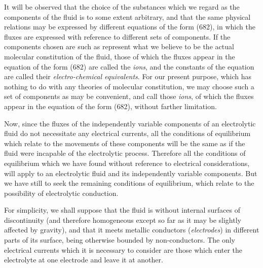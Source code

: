 \documentclass[12pt]{memoir}
\begin{document}
It will be observed that the choice of the substances which we regard as the components of the fluid is to some extent arbitrary, and that the same physical relations may be expressed by different equations of the form (682), in which the fluxes are expressed with reference to different sets of components. If the components chosen are such as represent what we believe to be the actual molecular constitution of the fluid, those of which the fluxes appear in the equation of the form (682) are called the \textit{ions}, and the constants of the equation are called their \textit{electro-chemical equivalents}. For our present purpose, which has nothing to do with any theories of molecular constitution, we may choose such a set of components as may be convenient, and call those \textit{ions}, of which the fluxes appear in the equation of the form (682), without farther limitation.

Now, since the fluxes of the independently variable components of an electrolytic fluid do not necessitate any electrical currents, all the conditions of equilibrium which relate to the movements of these components will be the same as if the fluid were incapable of the electrolytic process. Therefore all the conditions of equilibrium which we have found without reference to electrical considerations, will apply to an electrolytic fluid and its independently variable components. But we have still to seek the remaining conditions of equilibrium, which relate to the possibility of electrolytic conduction.

For simplicity, we shall suppose that the fluid is without internal surfaces of discontinuity (and therefore homogeneous except so far as it may be slightly affected by gravity), and that it meets metallic conductors (\textit{electrodes}) in different parts of its surface, being otherwise bounded by non-conductors. The only electrical currents which it is necessary to consider are those which enter the electrolyte at one electrode and leave it at another.
\end{document}
